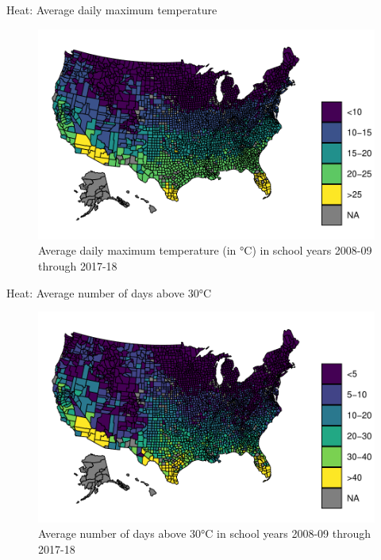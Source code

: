 \documentclass[hyperref={colorlinks = true,linkcolor = blue, citecolor=blue,urlcolor=blue}]{beamer}
\begin{document}
\begin{frame}{Heat: Average daily maximum temperature}
	\begin{figure}[!h]
		\centering
		\includegraphics[scale=0.65]{"../Code & Data/HeatMapTemp.pdf"}
		\caption{Average daily maximum temperature (in °C) in school years 2008-09 through 2017-18}
		\label{HeatMapTemp}
	\end{figure}
\end{frame}

\begin{frame}{Heat: Average number of days above 30°C}
	\begin{figure}[!h]
		\centering
		\includegraphics[scale=0.65]{"../Code & Data/HeatMapDays.pdf"}
		\caption{Average number of days above 30°C in school years 2008-09 through 2017-18}
		\label{HeatMapDays}
	\end{figure}
\end{frame}
\end{document}

